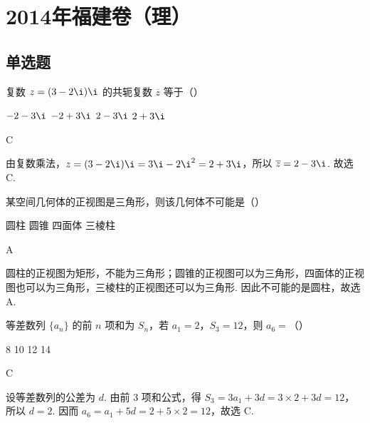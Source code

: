 \chapter{2014年福建卷（理）}

\section{单选题}

\begin{problem}
复数 \(z = (3 - 2\i)\i\) 的共轭复数 \(\overline{z}\) 等于（\quad）

\choices
    {\(-2 - 3\i\)}
    {\(-2 + 3\i\)}
    {\(2 - 3\i\)}
    {\(2 + 3\i\)}
\end{problem}

\begin{answer}
C
\end{answer}

\begin{solution}
由复数乘法，\(z=(3-2\i)\i=3\i-2\i^2=2+3\i\)，所以 \(\overline{z}=2-3\i\). 故选 C.
\end{solution}

\begin{problem}
某空间几何体的正视图是三角形，则该几何体不可能是（\quad）

\choices
    {圆柱}
    {圆锥}
    {四面体}
    {三棱柱}
\end{problem}

\begin{answer}
A
\end{answer}

\begin{solution}
圆柱的正视图为矩形，不能为三角形；圆锥的正视图可以为三角形，四面体的正视图也可以为三角形，三棱柱的正视图还可以为三角形. 因此不可能的是圆柱，故选 A.
\end{solution}

\begin{problem}
等差数列 \(\{a_{n}\}\) 的前 \(n\) 项和为 \(S_{n}\)，若 \(a_{1} = 2\)，\(S_{3} = 12\)，则 \(a_{6} =\)（\quad）

\choices
    {8}
    {10}
    {12}
    {14}
\end{problem}

\begin{answer}
C
\end{answer}

\begin{solution}
设等差数列的公差为 \(d\). 由前 \(3\) 项和公式，得 \(S_3=3a_1+3d=3\times2+3d=12\)，所以 \(d=2\). 因而 \(a_6=a_1+5d=2+5\times2=12\)，故选 C.
\end{solution}

